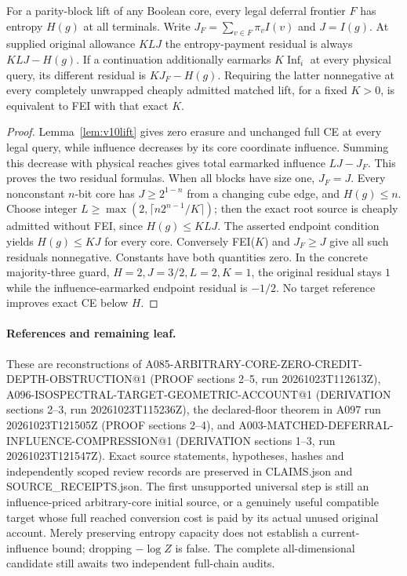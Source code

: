 \begin{theorem}\label{thm:v10rate}
For a parity-block lift of any Boolean core, every legal deferral
frontier $F$ has entropy $H(g)$ at all terminals. Write
$J_F=\sum_{v\in F}\pi_vI(v)$ and $J=I(g)$. At supplied original
allowance $K L J$ the entropy-payment residual is always $K L J-H(g)$.
If a continuation additionally earmarks $K\operatorname{Inf}_i$ at
every physical query, its different residual is $KJ_F-H(g)$. Requiring
the latter nonnegative at every completely unwrapped cheaply admitted
matched lift, for a fixed $K>0$, is equivalent to FEI with that exact
$K$.
\end{theorem}
\begin{proof}
Lemma~\ref{lem:v10lift} gives zero erasure and unchanged full CE at
every legal query, while influence decreases by its core coordinate
influence. Summing this decrease with physical reaches gives total
earmarked influence $LJ-J_F$. This proves the two residual formulas.
When all blocks have size one, $J_F=J$. Every nonconstant $n$-bit core
has $J\ge2^{1-n}$ from a changing cube edge, and $H(g)\le n$.
Choose integer $L\ge\max(2,\lceil n2^{n-1}/K\rceil)$; then the exact
root source is cheaply admitted without FEI, since $H(g)\le KLJ$.
The asserted endpoint condition yields $H(g)\le KJ$ for every core.
Conversely FEI($K$) and $J_F\ge J$ give all such residuals
nonnegative. Constants have both quantities zero. In the concrete
majority-three guard, $H=2,J=3/2,L=2,K=1$, the original residual
stays $1$ while the influence-earmarked endpoint residual is $-1/2$.
No target reference improves exact CE below $H$.
\end{proof}

\paragraph{References and remaining leaf.}
These are reconstructions of A085-ARBITRARY-CORE-ZERO-CREDIT-DEPTH-OBSTRUCTION@1
(PROOF sections 2--5, run 20261023T112613Z),
A096-ISOSPECTRAL-TARGET-GEOMETRIC-ACCOUNT@1
(DERIVATION sections 2--3, run 20261023T115236Z),
the declared-floor theorem in A097 run 20261023T121505Z (PROOF sections 2--4),
and A003-MATCHED-DEFERRAL-INFLUENCE-COMPRESSION@1
(DERIVATION sections 1--3, run 20261023T121547Z).
Exact source statements, hypotheses, hashes and independently scoped
review records are preserved in CLAIMS.json and SOURCE_RECEIPTS.json.
The first unsupported universal step is still an influence-priced
arbitrary-core initial source, or a genuinely useful compatible target
whose full reached conversion cost is paid by its actual unused original
account. Merely preserving entropy capacity does not establish a
current-influence bound; dropping $-\log Z$ is false. The complete
all-dimensional candidate still awaits two independent full-chain audits.
